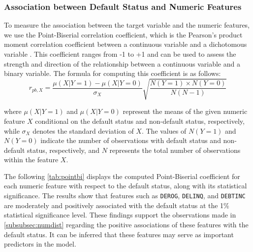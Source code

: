 \subsubsection{Association between Default Status and Numeric Features}
\label{subsubsec:target-num-ass}

To measure the association between the target variable and the numeric features, we use the Point-Biserial correlation coefficient, which is the Pearson's product moment correlation coefficient between a continuous variable and a dichotomous variable \citep{kornbrot2014point}.
This coefficient ranges from -1 to +1 and can be used to assess the strength and direction of the relationship between a continuous variable and a binary variable.
The formula for computing this coefficient is as follows:
\begin{equation}\label{eq}
r_{pb,X} =  \frac{\mu \left( X | Y=1 \right) -\mu \left( X | Y=0 \right)}{\sigma_{X}}\sqrt{\frac{N\left(Y=1\right) \times N\left(Y=0\right)}{N \left(N - 1 \right)}}
\end{equation}

where $\mu \left( X | Y=1 \right)$ and $\mu \left( X | Y=0 \right)$ represent the means of the given numeric feature $X$ conditional on the default status and non-default status, respectively, while $\sigma_{X}$ denotes the standard deviation of $X$.
The values of $N\left(Y=1\right)$ and $N\left(Y=0\right)$ indicate the number of observations with default status and non-default status, respectively, and $N$ represents the total number of observations within the feature $X$.


The following \autoref{tab:pointbi} displays the computed Point-Biserial coefficient for each numeric feature with respect to the default status, along with its statistical significance.
The results show that features such as \texttt{DEROG}, \texttt{DELINQ}, and \texttt{DEBTINC} are moderately and positively associated with the default status at the 1\% statistical significance level.
These findings support the observations made in \autoref{subsubsec:numdist} regarding the positive associations of these features with the default status. It can be inferred that these features may serve as important predictors in the model.


